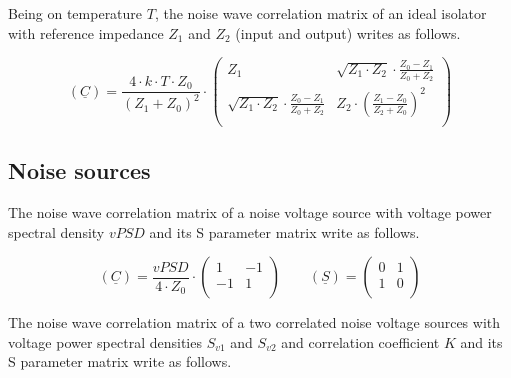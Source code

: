 Being on temperature $T$, the noise wave correlation matrix of an
ideal isolator with reference impedance $Z_1$ and $Z_2$ (input and
output) writes as follows.

\begin{equation}
(\underline{C}) = \frac{4\cdot k\cdot T\cdot Z_0}{(Z_1+Z_0)^2}\cdot
\begin{pmatrix}
  Z_1           & \sqrt{Z_1\cdot Z_2}\cdot\frac{Z_0-Z_1}{Z_0+Z_2}\\
  \sqrt{Z_1\cdot Z_2}\cdot\frac{Z_0-Z_1}{Z_0+Z_2} & Z_2\cdot\left(\frac{Z_1-Z_0}{Z_2+Z_0}\right)^2\\
\end{pmatrix}
\end{equation}


\subsection{Noise sources}

The noise wave correlation matrix of a noise voltage source with
voltage power spectral density $vPSD$ and its S parameter matrix
write as follows.

\begin{equation}
(\underline{C}) = \frac{vPSD}{4\cdot Z_0}\cdot
\begin{pmatrix}
   1 & -1\\
  -1 &  1\\
\end{pmatrix}
\qquad
(\underline{S}) =
\begin{pmatrix}
   0 &  1\\
   1 &  0\\
\end{pmatrix}
\end{equation}

The noise wave correlation matrix of a two correlated noise voltage
sources with voltage power spectral densities $S_{v1}$ and $S_{v2}$
and correlation coefficient $K$ and its S parameter matrix write as
follows.

